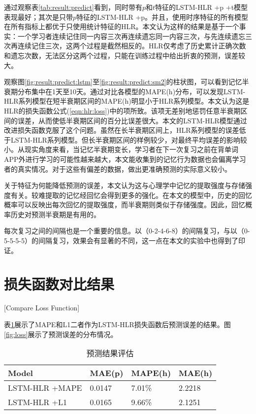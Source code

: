 通过观察表\ref{tab:result:predict}看到，同时带有$p$和$t$特征的LSTM-HLR +p +t模型表现最好；其次是只带$p$特征的LSTM-HLR +p。并且，使用时序特征的所有模型在所有指标上都优于只使用统计特征的HLR。本文认为这样的结果是基于一个事实：一个学习者连续记住同一内容三次再连续遗忘同一内容三次，与先连续遗忘三次再连续记住三次，这两个过程是截然相反的。HLR仅考虑了历史累计正确次数和遗忘次数，无法区分这两个过程，只能在训练过程中给出折衷的预测，误差较大。

观察图\ref{fig:result:predict:lstm}至\ref{fig:result:predict:sm2}的柱状图，可以看到记忆半衰期分布集中在1天至10天。通过对比各模型的MAPE(h)分布，可以发现LSTM-HLR系列模型在短半衰期区间的MAPE(h)明显小于HLR系列模型。本文认为这是HLR的损失函数公式(\ref{eqn:hlr:loss})中的项所致。该项无差别地惩罚任意半衰期区间的误差，从而使低半衰期区间的百分比误差很大。本文的LSTM-HLR模型通过改进损失函数克服了这个问题。虽然在长半衰期区间上，HLR系列模型的误差低于LSTM-HLR系列模型。但长半衰期区间的样例较少，对最终平均误差的影响较小。从现实角度来看，当记忆半衰期变长，学习者在下一次复习之前在背单词APP外进行学习的可能性越来越大，本文能收集到的记忆行为数据也会偏离学习者的真实情况。对于这些有偏差的数据，做出更准确预测的实际意义较小。

关于特征为何能降低预测的误差，本文认为这与心理学中记忆的提取强度与存储强度有关。较难提取的记忆经回忆会得到更多的强化\cite{bjorkNewTheoryDisuse1992}。在本文的模型中，历史的回忆概率可以反映出每次回忆的提取强度，而半衰期则类似于存储强度。因此，回忆概率历史对预测半衰期是有用的。

每次复习之间的间隔也是一个重要的信息。以（0-2-4-6-8）的间隔复习，与以（0-5-5-5-5）的间隔复习，效果会有显著的不同\cite{maddoxRoleForgettingRate2011}，这一点在本文的实验中也得到了印证。

\section{损失函数对比结果}[Compare Loss Function]

表\ref{tab:loss}展示了MAPE和L1二者作为LSTM-HLR损失函数后预测误差的结果。图\ref{fig:loss}展示了预测误差的分布情况。

\begin{table}[htbp]
    \caption{预测结果评估}
    \label{tab:loss}
    \vspace{0.5em}\centering\wuhao
    \begin{tabular}{llll}
    \toprule[1.5pt]
    \textbf{Model}  &\textbf{MAE(p)} &\textbf{MAPE(h)} &\textbf{MAE(h)}\\
    \midrule[1pt]
    LSTM-HLR +MAPE  &0.0147   &7.01\%   &2.2218\\
    LSTM-HLR +L1    &0.0165   &9.66\%   &2.1251\\
    \bottomrule[1.5pt]
    \end{tabular}
\end{table}

